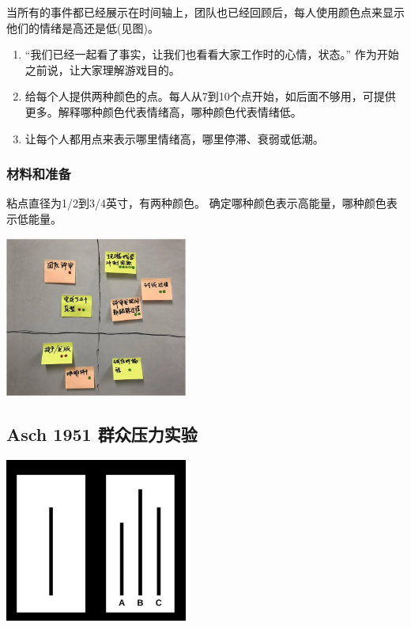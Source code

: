 当所有的事件都已经展示在时间轴上，团队也已经回顾后，每人使用颜色点来显示他们的情绪是高还是低(见图)。

\begin{enumerate}
\tightlist
\item
  ``我们已经一起看了事实，让我们也看看大家工作时的心情，状态。''
  作为开始之前说，让大家理解游戏目的。
\item
  给每个人提供两种颜色的点。每人从7到10个点开始，如后面不够用，可提供更多。解释哪种颜色代表情绪高，哪种颜色代表情绪低。
\item
  让每个人都用点来表示哪里情绪高，哪里停滞、衰弱或低潮。
\end{enumerate}

\hypertarget{ux6750ux6599ux548cux51c6ux5907-2}{%
\subsubsection{材料和准备}\label{ux6750ux6599ux548cux51c6ux5907-2}}

粘点直径为1/2到3/4英寸，有两种颜色。
确定哪种颜色表示高能量，哪种颜色表示低能量。


\includegraphics[width=6cm]{便利贴1.jpg}

\hypertarget{asch-1951-ux7fa4ux4f17ux538bux529bux5b9eux9a8c}{%
\subsection{Asch 1951
群众压力实验}\label{asch-1951-ux7fa4ux4f17ux538bux529bux5b9eux9a8c}}


\includegraphics[width=6cm]{Asch0Screenshot_2022-07-09_161023.jpg}

